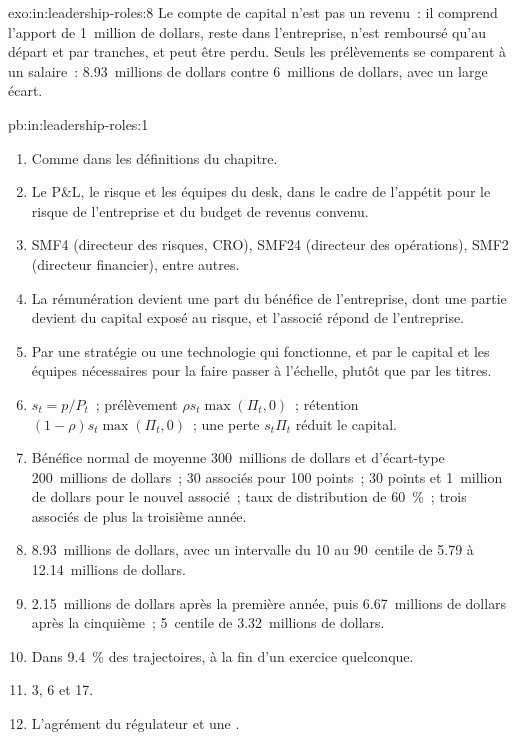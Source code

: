 \begin{solution}{exo:in:leadership-roles:8}
Le compte de capital n'est pas un revenu~: il comprend l'apport de 1~million de dollars, reste dans l'entreprise, n'est remboursé qu'au
départ et par tranches, et peut être perdu. Seuls les prélèvements se comparent à un salaire~: 8.93~millions de dollars contre 6~millions de dollars,
avec un large écart.
\end{solution}

\begin{solution}{pb:in:leadership-roles:1}
\begin{enumerate}
\item Comme dans les définitions du chapitre.
\item Le P\&L, le risque et les équipes du desk, dans le cadre de l'appétit pour le risque de l'entreprise et du budget de revenus convenu.
\item SMF4 (directeur des risques, CRO), SMF24 (directeur des opérations), SMF2 (directeur financier), entre autres.
\item La rémunération devient une part du bénéfice de l'entreprise, dont une partie devient du capital exposé au risque, et l'associé répond de l'entreprise.
\item Par une stratégie ou une technologie qui fonctionne, et par le capital et les équipes nécessaires pour la faire passer à l'échelle, plutôt que par les titres.
\item $s_t=p/P_t$~; prélèvement $\rho s_t\max(\Pi_t,0)$~; rétention $(1-\rho)s_t\max(\Pi_t,0)$~; une perte $s_t\Pi_t$ réduit le capital.
\item Bénéfice normal de moyenne 300~millions de dollars et d'écart-type 200~millions de dollars~; 30 associés pour 100 points~; 30 points
et 1~million de dollars pour le nouvel associé~; taux de distribution de 60~\%~; trois associés de plus la troisième année.
\item 8.93~millions de dollars, avec un intervalle du 10 au 90~centile de 5.79 à 12.14~millions de dollars.
\item 2.15~millions de dollars après la première année, puis 6.67~millions de dollars après la cinquième~; 5~centile de 3.32~millions de dollars.
\item Dans 9.4~\% des trajectoires, à la fin d'un exercice quelconque.
\item 3, 6 et 17.
\item L'agrément du régulateur et une .

\end{enumerate}
\end{solution}
